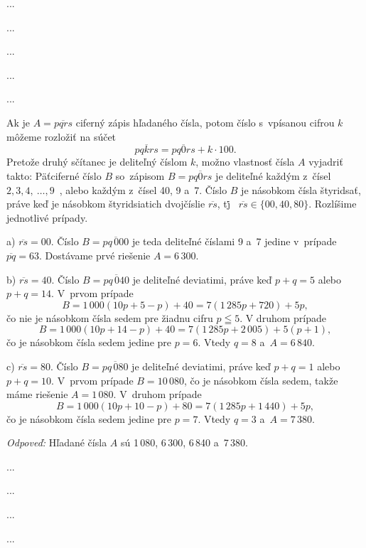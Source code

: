 {%
...}

{%
...}

{%
...}

{%
...}

{%
...}

{%
Ak je $A=\overline{pqrs}$ ciferný zápis hľadaného čísla, potom číslo
s~vpísanou
cifrou $k$ môžeme rozložiť na súčet
$$
\overline{pqkrs}=\overline{pq0rs}+k\cdot 100.
$$
Pretože druhý sčítanec je deliteľný číslom $k$, možno vlastnosť čísla
$A$ vyjadriť takto:
Päťciferné číslo $B$ so~zápisom $B=\overline{pq0rs}$ je
deliteľné každým z~čísel $2, 3, 4,~ \dots, 9$~, alebo každým
z~čísel 40, 9 a~7. Číslo $B$ je násobkom čísla štyridsať, práve keď je
násobkom štyridsiatich dvojčíslie $\overline{rs}$, t\.j\.~
$\overline{rs}\in \{00, 40, 80\}$. Rozlíšime jednotlivé prípady.

\goodbreak
\item{a)} $\overline{rs}=00$. Číslo $B=\overline{pq\,000}$ je
teda deliteľné číslami 9 a~7 jedine v~prípade $\overline{pq}=63$.
Dostávame prvé riešenie $A=6\,300$.

\item{b)} $\overline{rs}=40$. Číslo $B=\overline{pq\,040}$ je
deliteľné deviatimi, práve keď $p+q=5$ alebo $p+q=14$. V~prvom
prípade
$$
B=1\,000(10p+5-p)+40=7(1\,285p+720)+5p,
$$
čo nie je násobkom čísla sedem pre žiadnu cifru $p\leqq 5$.
V druhom prípade
$$
B=1\,000(10p+14-p)+40=7(1\,285p+2\,005)+5(p+1),
$$
čo je násobkom čísla sedem jedine pre $p=6$. Vtedy $q=8$ a~$A=6\,840$.

\item{c)} $\overline{rs}=80$. Číslo $B=\overline{pq\,080}$ je
deliteľné deviatimi, práve keď $p+q=1$ alebo $p+q=10$. V~prvom
prípade $B=10\,080$, čo je násobkom čísla sedem, takže máme riešenie
$A=1\,080$. V~druhom prípade
$$
B=1\,000(10p+10-p)+80=7(1\,285p+1\,440)+5p,
$$
čo je násobkom čísla sedem jedine pre $p=7$. Vtedy $q=3$ a~$A=7\,380$.

{\it Odpoveď:} Hľadané čísla $A$ sú 1\,080, 6\,300, 6\,840 a~7\,380.
}

{%
...}

{%
...}

{%
...}

{%
...}

